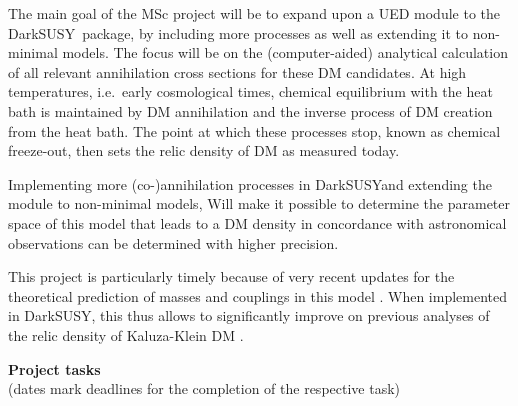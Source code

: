 \documentclass[12pt,a4paper]{article}
\newcommand{\ds}{{\sf DarkSUSY}}
\begin{document}
The main goal of the MSc project will be to expand upon a UED module to the \ds\ package, by including more processes as well as extending it to non-minimal models. %
The focus will be on the (computer-aided) analytical calculation of all relevant annihilation cross sections  
for these DM candidates. At high temperatures, i.e.~early cosmological times,
chemical equilibrium with the heat bath is maintained by DM annihilation and the inverse process of DM
creation from the heat bath. The point at which these processes stop, known
as chemical freeze-out, then sets the relic density of DM as measured today. 

Implementing more (co-)annihilation processes in \ds and extending the module to non-minimal models, Will make it possible to determine  the 
parameter space of this model that leads to a DM density in concordance with astronomical observations can be determined with higher precision.

This project is particularly timely because of very recent updates for the theoretical prediction of 
masses and couplings in this model \cite{Freitas:2017afm}. When implemented in \ds, this thus allows
to significantly improve on previous analyses of the relic density of Kaluza-Klein DM \cite{KKoh2}. 
 
\vspace*{0.6cm}
\noindent
{\bf Project tasks}\\
{\scriptsize (dates mark deadlines for the completion of the respective task)}\\[-3ex]
\end{document}
